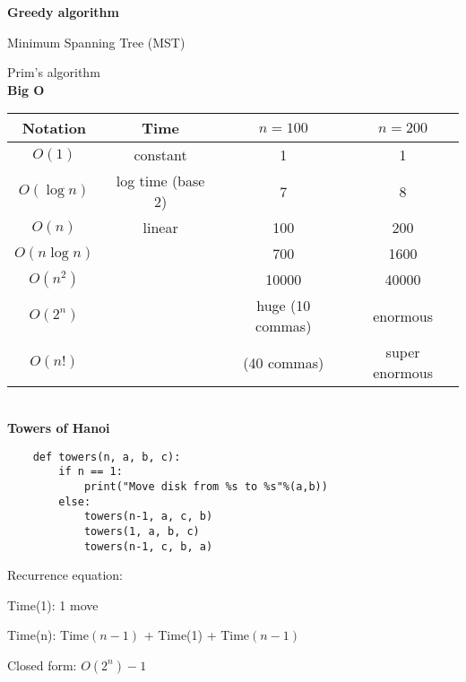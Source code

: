 \documentclass{exam}
\begin{document}
	
    \textbf{Greedy algorithm}

    Minimum Spanning Tree (MST)
    
    Prim's algorithm\\
    
    
    \textbf{Big O}
    
    \begin{tabular}{c|c|cc}
        Notation&Time&$n=100$&$n=200$\\
        \hline
        $O(1)$&constant&1&1\\
        $O(\log n)$&log time (base 2)&7&8\\
        $O(n)$&linear&100&200\\
        $O(n \log n)$&&700&1600\\
        $O(n^2)$&&10000&40000\\
        $O(2^n)$&&huge (10 commas)&enormous\\
        $O(n!)$&&(40 commas)&super enormous\\
    \end{tabular}\\

    \textbf{Towers of Hanoi}
    
    \begin{lstlisting}
    def towers(n, a, b, c):
        if n == 1:
            print("Move disk from %s to %s"%(a,b))
        else:
            towers(n-1, a, c, b)
            towers(1, a, b, c)
            towers(n-1, c, b, a)
    \end{lstlisting}
    
    Recurrence equation:
    
    Time(1): 1 move
    
    Time(n): Time$(n-1)$ + Time(1) + Time$(n-1)$
    
    Closed form: $O(2^n) - 1$
    
\end{document}
